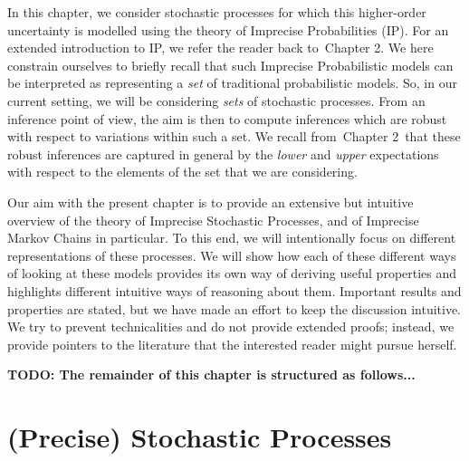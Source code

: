 \documentclass[graybox]{svmult}
\def\refIPChapter{Chapter 2}
\begin{document}
In this chapter, we consider stochastic processes for which this higher-order uncertainty is modelled using the theory of Imprecise Probabilities (IP). For an extended introduction to IP, we refer the reader back to~\refIPChapter. We here constrain ourselves to briefly recall that such Imprecise Probabilistic models can be interpreted as representing a \emph{set} of traditional probabilistic models. So, in our current setting, we will be considering \emph{sets} of stochastic processes. From an inference point of view, the aim is then to compute inferences which are robust with respect to variations within such a set. We recall from~\refIPChapter~that these robust inferences are captured in general by the \emph{lower} and \emph{upper} expectations with respect to the elements of the set that we are considering.

Our aim with the present chapter is to provide an extensive but intuitive overview of the theory of Imprecise Stochastic Processes, and of Imprecise Markov Chains in particular. To this end, we will intentionally focus on different representations of these processes. We will show how each of these different ways of looking at these models provides its own way of deriving useful properties and highlights different intuitive ways of reasoning about them. Important results and properties are stated, but we have made an effort to keep the discussion intuitive. We try to prevent technicalities and do not provide extended proofs; instead, we provide pointers to the literature that the interested reader might pursue herself.

{\bf TODO: The remainder of this chapter is structured as follows...}

\section{(Precise) Stochastic Processes}\label{sec:prec_stoch_proc}

\end{document}
